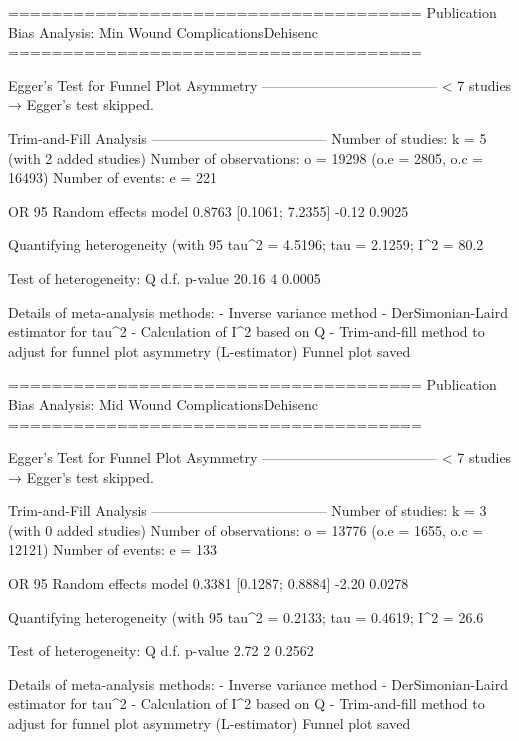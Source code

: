 ======================================
Publication Bias Analysis: Min Wound ComplicationsDehisenc 
======================================
                                                                                                                                                        
Egger's Test for Funnel Plot Asymmetry
--------------------------------------
  < 7 studies → Egger’s test skipped.

Trim-and-Fill Analysis
--------------------------------------
Number of studies: k = 5 (with 2 added studies)
Number of observations: o = 19298 (o.e = 2805, o.c = 16493)
Number of events: e = 221

                         OR           95%
Random effects model 0.8763 [0.1061; 7.2355] -0.12  0.9025

Quantifying heterogeneity (with 95%
 tau^2 = 4.5196; tau = 2.1259; I^2 = 80.2%

Test of heterogeneity:
     Q d.f. p-value
 20.16    4  0.0005

Details of meta-analysis methods:
- Inverse variance method
- DerSimonian-Laird estimator for tau^2
- Calculation of I^2 based on Q
- Trim-and-fill method to adjust for funnel plot asymmetry (L-estimator)
  Funnel plot saved

======================================
Publication Bias Analysis: Mid Wound ComplicationsDehisenc 
======================================
                                                                                                                                                        
Egger's Test for Funnel Plot Asymmetry
--------------------------------------
  < 7 studies → Egger’s test skipped.

Trim-and-Fill Analysis
--------------------------------------
Number of studies: k = 3 (with 0 added studies)
Number of observations: o = 13776 (o.e = 1655, o.c = 12121)
Number of events: e = 133

                         OR           95%
Random effects model 0.3381 [0.1287; 0.8884] -2.20  0.0278

Quantifying heterogeneity (with 95%
 tau^2 = 0.2133; tau = 0.4619; I^2 = 26.6%

Test of heterogeneity:
    Q d.f. p-value
 2.72    2  0.2562

Details of meta-analysis methods:
- Inverse variance method
- DerSimonian-Laird estimator for tau^2
- Calculation of I^2 based on Q
- Trim-and-fill method to adjust for funnel plot asymmetry (L-estimator)
  Funnel plot saved

